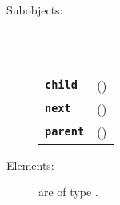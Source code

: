 \begin{description}
  \item[Subobjects:] \hfill \\
\ 
    \begin{tabular}{ll}
      \texttt{\textbf{child}} & (\Jref{module}{???}) \\
      \texttt{\textbf{next}} & (\Jref{module}{???}) \\
      \texttt{\textbf{parent}} & (\Jref{module}{???}) \\
    \end{tabular}
\vspace{3mm}

  \item[Elements:] are of type .


\end{description}

